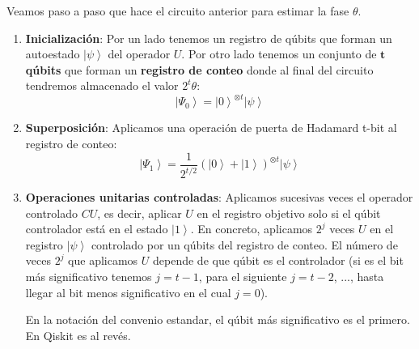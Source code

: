 \documentclass[a4paper,11pt]{book} %
\numberwithin{equation}{chapter}
\begin{document}
Veamos paso a paso que hace el circuito anterior para estimar la fase $\theta$.

\begin{enumerate}
	\item \textbf{Inicialización}: Por un lado tenemos un registro de qúbits que forman un autoestado $\left| \psi \right\rangle$ del operador $U$. Por otro lado tenemos un conjunto de $\bm t$ \textbf{qúbits} que forman un \textbf{registro de conteo} donde al final del circuito tendremos almacenado el valor $2^t \theta$:
$$
\left| \Psi_0 \right\rangle = \left| 0 \right\rangle^{\otimes t} \left| \psi \right\rangle
$$

	\item \textbf{Superposición}: Aplicamos una operación de puerta de Hadamard t-bit al registro de conteo:
$$
\left| \Psi_1 \right\rangle = \frac{1}{2^{t/2}}  \left( \left| 0 \right\rangle + \left| 1 \right\rangle \right)^{\otimes t} \left| \psi \right\rangle
$$

	\item \textbf{Operaciones unitarias controladas}: Aplicamos sucesivas veces el operador controlado $CU$, es decir, aplicar $U$ en el registro objetivo solo si el qúbit controlador está en el estado $\left| 1 \right\rangle$. En concreto, aplicamos $2^{j}$ veces $U$ en el registro $\left| \psi \right\rangle$ controlado por un qúbits del registro de conteo. El número de veces $2^{j}$ que aplicamos $U$ depende de que qúbit es el controlador (si es el bit más significativo tenemos $j = t-1$, para el siguiente $j = t-2$, ..., hasta llegar al bit menos significativo en el cual $j=0$). 
	
	En la notación del convenio estandar, el qúbit más significativo es el primero. En Qiskit es al revés.


\end{enumerate}
\end{document}
